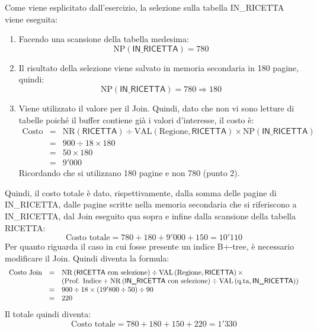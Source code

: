 \documentclass[a4paper]{article}
\begin{document}
	\noindent
	Come viene esplicitato dall'esercizio, la selezione sulla tabella \textsf{IN\_RICETTA} viene eseguita:
	\begin{enumerate}
		\item Facendo una scansione della tabella medesima:
		\begin{equation*}
			\mathrm{NP}\left(\textsf{IN\_RICETTA}\right) = 780
		\end{equation*}
		
		\item Il risultato della selezione viene salvato in memoria secondaria in 180 pagine, quindi:
		\begin{equation*}
			\mathrm{NP}\left(\textsf{IN\_RICETTA}\right) = 780 \Longrightarrow 180
		\end{equation*}
		
		\item Viene utilizzato il valore per il Join. Quindi, dato che non vi sono letture di tabelle poiché il buffer contiene già i valori d'interesse, il costo è:
		\begin{equation*}
			\begin{array}{lll}
				\text{Costo} &=& \mathrm{NR}\left(\textsf{RICETTA}\right) \div \mathrm{VAL}\left(\text{Regione}, \textsf{RICETTA}\right) \times \mathrm{NP}\left(\textsf{IN\_RICETTA}\right) \\
				&=& 900 \div 18 \times 180 \\
				&=& 50 \times 180 \\
				&=& 9'000
			\end{array}
		\end{equation*}
		Ricordando che si utilizzano 180 pagine e non 780 (punto 2).
	\end{enumerate}
	Quindi, il costo totale è dato, rispettivamente, dalla somma delle pagine di \textsf{IN\_RICETTA}, dalle pagine scritte nella memoria secondaria che si riferiscono a \textsf{IN\_RICETTA}, dal Join eseguito qua sopra e infine dalla scansione della tabella \textsf{RICETTA}:
	\begin{equation*}
		\text{Costo totale} = 780 + 180 + 9'000 + 150 = 10'110
	\end{equation*}
	Per quanto riguarda il caso in cui fosse presente un indice B+-tree, è necessario modificare il Join. Quindi diventa la formula:
	\begin{equation*}
		\begin{array}{lll}
			\text{Costo Join} &=& \mathrm{NR}\left(\text{\textsf{RICETTA} con selezione}\right) \div \mathrm{VAL}\left(\text{Regione}, \textsf{RICETTA}\right) \times \\
			&& \left(\text{Prof. Indice} + \mathrm{NR}\left(\textsf{IN\_RICETTA}\text{ con selezione}\right) \div \mathrm{VAL}\left(\text{q.ta}, \textsf{IN\_RICETTA}\right)\right) \\
			&=& 900 \div 18 \times \left(19'800 \div 50\right) \div 90 \\
			&=& 220
		\end{array}
	\end{equation*}
	Il totale quindi diventa:
	\begin{equation*}
		\text{Costo totale} = 780 + 180 + 150 + 220 = 1'330
	\end{equation*}\newpage
	
\end{document}
